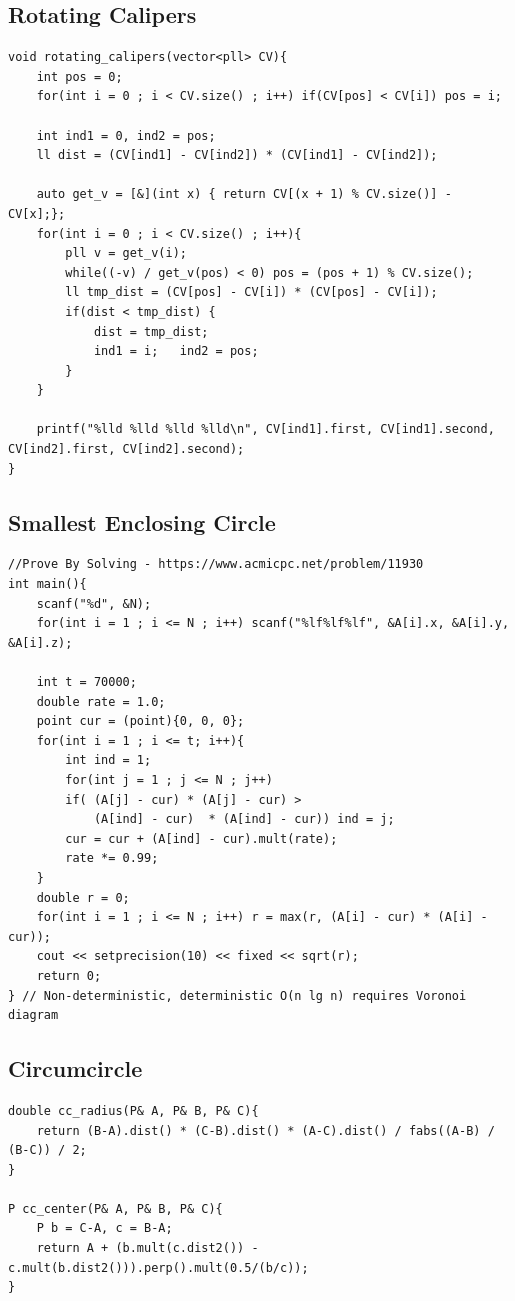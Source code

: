 \documentclass[landscape, 8pt, a4paper, oneside, twocolumn]{extarticle}
\begin{document}
\subsection{Rotating Calipers}
\begin{verbatim}
void rotating_calipers(vector<pll> CV){
    int pos = 0;
    for(int i = 0 ; i < CV.size() ; i++) if(CV[pos] < CV[i]) pos = i;

    int ind1 = 0, ind2 = pos;
    ll dist = (CV[ind1] - CV[ind2]) * (CV[ind1] - CV[ind2]);

    auto get_v = [&](int x) { return CV[(x + 1) % CV.size()] - CV[x];};
    for(int i = 0 ; i < CV.size() ; i++){
        pll v = get_v(i);
        while((-v) / get_v(pos) < 0) pos = (pos + 1) % CV.size();
        ll tmp_dist = (CV[pos] - CV[i]) * (CV[pos] - CV[i]);
        if(dist < tmp_dist) {
            dist = tmp_dist;
            ind1 = i;   ind2 = pos;
        }
    }

    printf("%lld %lld %lld %lld\n", CV[ind1].first, CV[ind1].second, CV[ind2].first, CV[ind2].second);
}
\end{verbatim}
\subsection{Smallest Enclosing Circle}
\begin{verbatim}
//Prove By Solving - https://www.acmicpc.net/problem/11930
int main(){
    scanf("%d", &N);
    for(int i = 1 ; i <= N ; i++) scanf("%lf%lf%lf", &A[i].x, &A[i].y, &A[i].z);

    int t = 70000;
    double rate = 1.0;
    point cur = (point){0, 0, 0};
    for(int i = 1 ; i <= t; i++){
        int ind = 1;
        for(int j = 1 ; j <= N ; j++)
        if( (A[j] - cur) * (A[j] - cur) >
            (A[ind] - cur)  * (A[ind] - cur)) ind = j;
        cur = cur + (A[ind] - cur).mult(rate);
        rate *= 0.99;
    }
    double r = 0;
    for(int i = 1 ; i <= N ; i++) r = max(r, (A[i] - cur) * (A[i] - cur));
    cout << setprecision(10) << fixed << sqrt(r);
    return 0;
} // Non-deterministic, deterministic O(n lg n) requires Voronoi diagram
\end{verbatim}
\subsection{Circumcircle}
\begin{verbatim}
double cc_radius(P& A, P& B, P& C){
    return (B-A).dist() * (C-B).dist() * (A-C).dist() / fabs((A-B) / (B-C)) / 2;
}

P cc_center(P& A, P& B, P& C){
    P b = C-A, c = B-A;
    return A + (b.mult(c.dist2()) - c.mult(b.dist2())).perp().mult(0.5/(b/c));
}
\end{verbatim}
\end{document}

